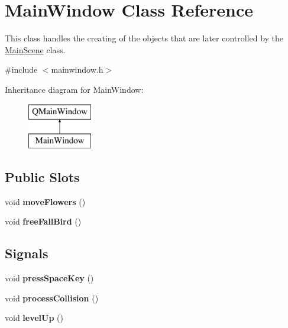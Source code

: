 \hypertarget{class_main_window}{}\section{Main\+Window Class Reference}
\label{class_main_window}


This class handles the creating of the objects that are later controlled by the \hyperlink{class_main_scene}{Main\+Scene} class.  




{\ttfamily \#include $<$mainwindow.\+h$>$}

Inheritance diagram for Main\+Window\+:\begin{figure}[H]
\begin{center}
\leavevmode
\includegraphics[height=2.000000cm]{class_main_window}
\end{center}
\end{figure}
\subsection*{Public Slots}
\begin{DoxyCompactItemize}
\item 
\hypertarget{class_main_window_a8f689d74e00fe7de42c89f81c5b63794}{}void {\bfseries move\+Flowers} ()\label{class_main_window_a8f689d74e00fe7de42c89f81c5b63794}

\item 
\hypertarget{class_main_window_a18e7270dcf1bcfe932068a1d2b7297d3}{}void {\bfseries free\+Fall\+Bird} ()\label{class_main_window_a18e7270dcf1bcfe932068a1d2b7297d3}

\end{DoxyCompactItemize}
\subsection*{Signals}
\begin{DoxyCompactItemize}
\item 
\hypertarget{class_main_window_aefc37cf67a2394c55485e6ccceedd612}{}void {\bfseries press\+Space\+Key} ()\label{class_main_window_aefc37cf67a2394c55485e6ccceedd612}

\item 
\hypertarget{class_main_window_a99aa56cd57bddd8bc91c3aa86a2d86a0}{}void {\bfseries process\+Collision} ()\label{class_main_window_a99aa56cd57bddd8bc91c3aa86a2d86a0}

\item 
\hypertarget{class_main_window_add1be06e623d9ca240573631e8b452dc}{}void {\bfseries level\+Up} ()\label{class_main_window_add1be06e623d9ca240573631e8b452dc}

\end{DoxyCompactItemize}
